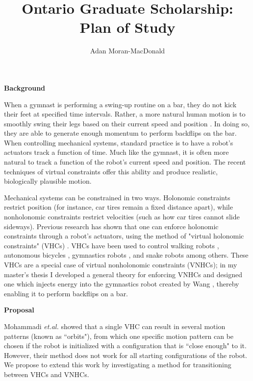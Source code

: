 \documentclass[a4paper,12pt]{article}
\begin{document}
\title{Ontario Graduate Scholarship: Plan of Study}
\author{Adan Moran-MacDonald}
\date{}
\maketitle

\begin{large}
\textbf{Background}
\end{large}

When a gymnast is performing a swing-up routine on a bar, they do not kick their
feet at specified time intervals. Rather, a more natural human motion is to
smoothly swing their legs based on their current speed and position
\cite{pendulum_length_giant_gymnastics}. In doing so, they are able to generate
enough momentum to perform backflips on the bar. When controlling mechanical
systems, standard practice is to have a robot's actuators track a function of
time. Much like the gymnast, it is often more natural to track a
function of the robot's current speed and position. The recent techniques
of virtual constraints offer this ability and produce realistic, biologically
plausible motion.

Mechanical systems can be constrained in two ways. Holonomic constraints
restrict position (for instance, car tires remain a fixed distance apart), while
nonholonomic constraints restrict velocities (such as how car tires cannot
slide sideways). Previous research has shown that one can enforce holonomic
constraints through a robot's actuators, using the method of "virtual holonomic
constraints" (VHCs) \cite{vhcs_for_el_systems}. VHCs have been used to control
walking robots \cite{stable-walking}, autonomous bicycles \cite{bicycle},
gymnastics robots \cite{xingbo-thesis}, and snake robots \cite{snake-robot}
among others. These VHCs are a special case of virtual nonholonomic constraints
(VNHCs); in my master's thesis \cite{my-thesis} I developed a general theory for
enforcing VNHCs and designed one which injects energy into the gymnastics robot
created by Wang \cite{xingbo-thesis}, thereby enabling it to perform backflips
on a bar.

\begin{large} \textbf{Proposal} \end{large}

Mohammadi \textit{et.al.} \cite{manfredi-orbit-stabilization} showed that a
single VHC can result in several motion patterns (known as ``orbits"), from
which one specific motion pattern can be chosen if the robot is initialized with a
configuration that is ``close enough" to it. However, their method does not
work for all starting configurations of the robot. We propose to extend this
work by investigating a method for transitioning between VHCs and VNHCs.
\end{document}
